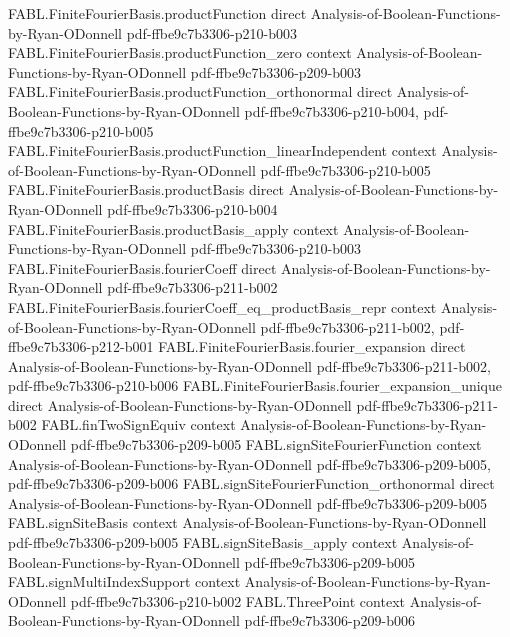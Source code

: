 \begin{theorem}
  {FABL.FiniteFourierBasis.productFunction}
  {direct}
  {Analysis-of-Boolean-Functions-by-Ryan-ODonnell}
  {pdf-ffbe9c7b3306-p210-b003}
\proofstep
  {FABL.FiniteFourierBasis.productFunction_zero}
  {context}
  {Analysis-of-Boolean-Functions-by-Ryan-ODonnell}
  {pdf-ffbe9c7b3306-p209-b003}
\proofstep
  {FABL.FiniteFourierBasis.productFunction_orthonormal}
  {direct}
  {Analysis-of-Boolean-Functions-by-Ryan-ODonnell}
  {pdf-ffbe9c7b3306-p210-b004,
    pdf-ffbe9c7b3306-p210-b005}
\proofstep
  {FABL.FiniteFourierBasis.productFunction_linearIndependent}
  {context}
  {Analysis-of-Boolean-Functions-by-Ryan-ODonnell}
  {pdf-ffbe9c7b3306-p210-b005}
\proofstep
  {FABL.FiniteFourierBasis.productBasis}
  {direct}
  {Analysis-of-Boolean-Functions-by-Ryan-ODonnell}
  {pdf-ffbe9c7b3306-p210-b004}
\proofstep
  {FABL.FiniteFourierBasis.productBasis_apply}
  {context}
  {Analysis-of-Boolean-Functions-by-Ryan-ODonnell}
  {pdf-ffbe9c7b3306-p210-b003}
\proofstep
  {FABL.FiniteFourierBasis.fourierCoeff}
  {direct}
  {Analysis-of-Boolean-Functions-by-Ryan-ODonnell}
  {pdf-ffbe9c7b3306-p211-b002}
\proofstep
  {FABL.FiniteFourierBasis.fourierCoeff_eq_productBasis_repr}
  {context}
  {Analysis-of-Boolean-Functions-by-Ryan-ODonnell}
  {pdf-ffbe9c7b3306-p211-b002,
    pdf-ffbe9c7b3306-p212-b001}
\proofstep
  {FABL.FiniteFourierBasis.fourier_expansion}
  {direct}
  {Analysis-of-Boolean-Functions-by-Ryan-ODonnell}
  {pdf-ffbe9c7b3306-p211-b002,
    pdf-ffbe9c7b3306-p210-b006}
\proofstep
  {FABL.FiniteFourierBasis.fourier_expansion_unique}
  {direct}
  {Analysis-of-Boolean-Functions-by-Ryan-ODonnell}
  {pdf-ffbe9c7b3306-p211-b002}
\proofstep
  {FABL.finTwoSignEquiv}
  {context}
  {Analysis-of-Boolean-Functions-by-Ryan-ODonnell}
  {pdf-ffbe9c7b3306-p209-b005}
\proofstep
  {FABL.signSiteFourierFunction}
  {context}
  {Analysis-of-Boolean-Functions-by-Ryan-ODonnell}
  {pdf-ffbe9c7b3306-p209-b005,
    pdf-ffbe9c7b3306-p209-b006}
\proofstep
  {FABL.signSiteFourierFunction_orthonormal}
  {direct}
  {Analysis-of-Boolean-Functions-by-Ryan-ODonnell}
  {pdf-ffbe9c7b3306-p209-b005}
\proofstep
  {FABL.signSiteBasis}
  {context}
  {Analysis-of-Boolean-Functions-by-Ryan-ODonnell}
  {pdf-ffbe9c7b3306-p209-b005}
\proofstep
  {FABL.signSiteBasis_apply}
  {context}
  {Analysis-of-Boolean-Functions-by-Ryan-ODonnell}
  {pdf-ffbe9c7b3306-p209-b005}
\proofstep
  {FABL.signMultiIndexSupport}
  {context}
  {Analysis-of-Boolean-Functions-by-Ryan-ODonnell}
  {pdf-ffbe9c7b3306-p210-b002}
\proofstep
  {FABL.ThreePoint}
  {context}
  {Analysis-of-Boolean-Functions-by-Ryan-ODonnell}
  {pdf-ffbe9c7b3306-p209-b006}

\end{theorem}
